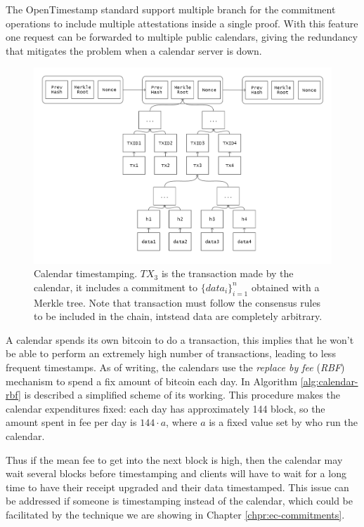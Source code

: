 The OpenTimestamp standard support multiple branch for the commitment operations to include multiple attestations inside a single proof. With this feature one request can be forwarded to multiple public calendars, giving the redundancy that mitigates the problem when a calendar server is down.

\begin{figure}
	\begin{center}
		\includegraphics[width=\linewidth]{Images/bitcoin-chain-calendar.png}
		\caption[Calendar timestamping.]{Calendar timestamping. $TX_3$ is the transaction made by the calendar, it includes a commitment to $\{data_i\}_{i=1}^n$ obtained with a Merkle tree. Note that transaction must follow the consensus rules to be included in the chain, intstead data are completely arbitrary.}
		\label{fig:chain-calendar}
	\end{center}
\end{figure}

A calendar spends its own bitcoin to do a transaction, this implies that he won't be able to perform an extremely high number of transactions, leading to less frequent timestamps. As of writing, the calendars use the \textit{replace by fee} (\textit{RBF}) mechanism to spend a fix amount of bitcoin each day. In Algorithm \ref{alg:calendar-rbf} is described a simplified scheme of its working.
This procedure makes the calendar expenditures fixed: each day has approximately 144 block, so the amount spent in fee per day is $144 \cdot a$, where $a$ is a fixed value set by who run the calendar.

Thus if the mean fee to get into the next block is high, then the calendar may wait several blocks before timestamping and clients will have to wait for a long time to have their receipt upgraded and their data timestamped. This issue can be addressed if someone is timestamping instead of the calendar, which could be facilitated by the technique we are showing in Chapter \ref{chpr:ec-commitments}. 

